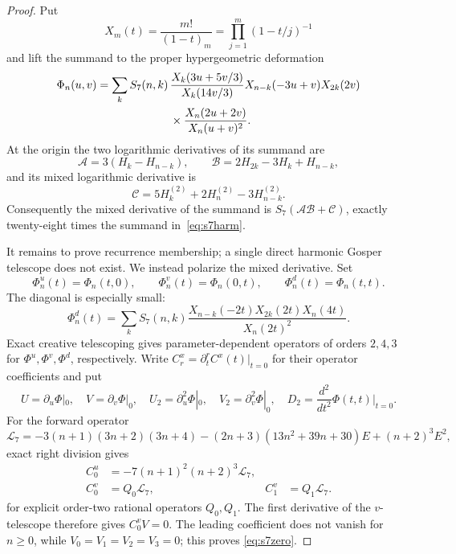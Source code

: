\documentclass[11pt,reqno]{amsart}
\theoremstyle{definition}
\theoremstyle{remark}
\begin{document}
\begin{proof}
Put
\[
 X_m(t)=\frac{m!}{(1-t)_m}
       =\prod_{j=1}^m(1-t/j)^{-1}
\]
and lift the summand to the proper hypergeometric deformation
\begin{align}\label{eq:s7Phi}
 \Phi_n(u,v)=\sum_k S_7(n,k)\,&
 \frac{X_k(3u+5v/3)}{X_k(14v/3)}X_{n-k}(-3u+v)X_{2k}(2v)\notag\\
 &\times\frac{X_n(2u+2v)}{X_n(u+v)^2}.
\end{align}
At the origin the two logarithmic derivatives of its summand are
\[
 \mathcal A=3(H_k-H_{n-k}),\qquad
 \mathcal B=2H_{2k}-3H_k+H_{n-k},
\]
and its mixed logarithmic derivative is
\[
 \mathcal C=5H_k^{(2)}+2H_n^{(2)}-3H_{n-k}^{(2)}.
\]
Consequently the mixed derivative of the summand is
$S_7(\mathcal A\mathcal B+\mathcal C)$, exactly twenty-eight times the
summand in~\eqref{eq:s7harm}.

It remains to prove recurrence membership; a single direct harmonic Gosper
telescope does not exist.  We instead polarize the mixed derivative.  Set
\[
 \Phi^u_n(t)=\Phi_n(t,0),\qquad
 \Phi^v_n(t)=\Phi_n(0,t),\qquad
 \Phi^d_n(t)=\Phi_n(t,t).
\]
The diagonal is especially small:
\begin{equation}\label{eq:s7diag}
 \Phi^d_n(t)=\sum_kS_7(n,k)
 \frac{X_{n-k}(-2t)X_{2k}(2t)X_n(4t)}{X_n(2t)^2}.
\end{equation}
Exact creative telescoping gives parameter-dependent operators of orders
$2,4,3$ for $\Phi^u,\Phi^v,\Phi^d$, respectively.  Write
$C_r^x=\partial_t^rC^x(t)|_{t=0}$ for their operator coefficients and put
\[
 U=\partial_u\Phi|_0,\quad V=\partial_v\Phi|_0,\quad
 U_2=\partial_u^2\Phi|_0,\quad V_2=\partial_v^2\Phi|_0,
 \quad D_2=\frac{d^2}{dt^2}\Phi(t,t)\big|_{t=0}.
\]
For the forward operator
\begin{equation}\label{eq:s7L}
 \mathcal L_7=-3(n+1)(3n+2)(3n+4)
 -(2n+3)(13n^2+39n+30)E+(n+2)^3E^2,
\end{equation}
exact right division gives
\begin{align*}
 C_0^u&=-7(n+1)^2(n+2)^3\mathcal L_7,\\
 C_0^v&=Q_0\mathcal L_7, & C_1^v&=Q_1\mathcal L_7.
\end{align*}
for explicit order-two rational operators $Q_0,Q_1$.  The first derivative
of the $v$-telescope therefore gives $C_0^vV=0$.  The leading coefficient
does not vanish for $n\geq0$, while $V_0=V_1=V_2=V_3=0$; this proves
\eqref{eq:s7zero}.


\end{proof}
\end{document}
